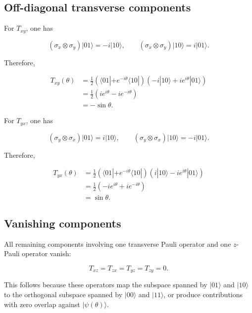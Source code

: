 \medskip

\subsection*{Off-diagonal transverse components}

For \( T_{xy} \), one has

\[
(\sigma_x \otimes \sigma_y)|01\rangle
=
-i|10\rangle,
\qquad
(\sigma_x \otimes \sigma_y)|10\rangle
=
i|01\rangle.
\]

Therefore,

\begin{align}
T_{xy}(\theta)
&=
\frac{1}{2}
\left(
\langle 01|
+
e^{-i\theta}\langle 10|
\right)
\left(
-i|10\rangle
+
i e^{i\theta}|01\rangle
\right)
\nonumber
\\
&=
\frac{1}{2}
\left(
i e^{i\theta}
-
i e^{-i\theta}
\right)
\nonumber
\\
&=
-\sin\theta.
\label{eq:der_Txy_phase_model}
\end{align}

For \( T_{yx} \), one has

\[
(\sigma_y \otimes \sigma_x)|01\rangle
=
i|10\rangle,
\qquad
(\sigma_y \otimes \sigma_x)|10\rangle
=
-i|01\rangle.
\]

Therefore,

\begin{align}
T_{yx}(\theta)
&=
\frac{1}{2}
\left(
\langle 01|
+
e^{-i\theta}\langle 10|
\right)
\left(
i|10\rangle
-
i e^{i\theta}|01\rangle
\right)
\nonumber
\\
&=
\frac{1}{2}
\left(
-i e^{i\theta}
+
i e^{-i\theta}
\right)
\nonumber
\\
&=
\sin\theta.
\label{eq:der_Tyx_phase_model}
\end{align}

\medskip

\subsection*{Vanishing components}

All remaining components involving one transverse Pauli operator and one \( z \)-Pauli operator vanish:

\begin{equation}
T_{xz}
=
T_{zx}
=
T_{yz}
=
T_{zy}
=
0.
\label{eq:der_vanishing_phase_tensor_components}
\end{equation}

This follows because these operators map the subspace spanned by \( |01\rangle \) and \( |10\rangle \) to the orthogonal subspace spanned by \( |00\rangle \) and \( |11\rangle \), or produce contributions with zero overlap against \( |\psi(\theta)\rangle \).

